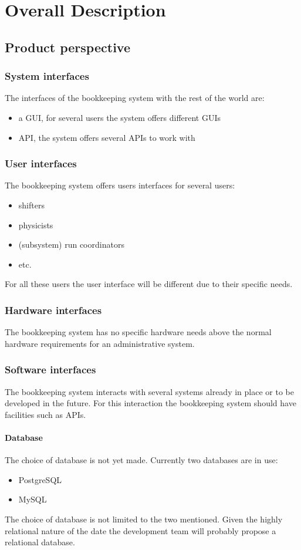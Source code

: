 \chapter{Overall Description}

\section{Product perspective}

\subsection{System interfaces}
The interfaces of the bookkeeping system with the rest of the world are:
\begin{itemize}
  \item a GUI, for several users the system offers different GUIs
  \item API, the system offers several APIs to work with
\end{itemize}

\subsection{User interfaces}
The bookkeeping system offers users interfaces for several users:
\begin{itemize}
  \item shifters
  \item physicists
  \item (subsystem) run coordinators
  \item etc.
\end{itemize}
For all these users the user interface will be different due to their specific needs.

\subsection{Hardware interfaces}
The bookkeeping system has no specific hardware needs above the normal hardware requirements for an administrative system.

\subsection{Software interfaces}
The bookkeeping system interacts with several systems already in place or to be developed in the future. For this interaction the bookkeeping system should have facilities such as APIs.

\subsubsection{Database}
The choice of database is not yet made. Currently two databases are in use:
\begin{itemize}
  \item PostgreSQL
  \item MySQL
\end{itemize}
The choice of database is not limited to the two mentioned. Given the highly relational nature of the date the development team will probably propose a relational database.

